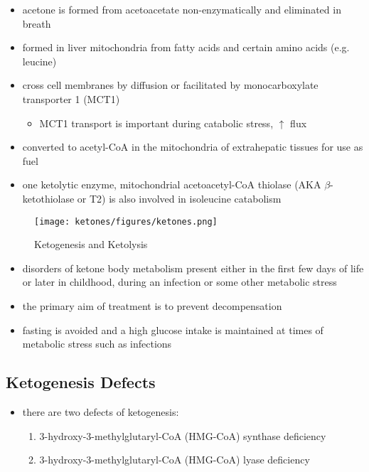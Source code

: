 \documentclass[12pt]{scrartcl}
\begin{document}
\begin{itemize}
\item acetone is formed from acetoacetate non-enzymatically and eliminated in breath
\item formed in liver mitochondria from fatty acids and certain amino acids (e.g. leucine)
\item cross cell membranes by diffusion or facilitated by monocarboxylate transporter 1 (MCT1)
\begin{itemize}
\item MCT1 transport is important during catabolic stress, \(\uparrow\) flux
\end{itemize}
\item converted to acetyl-CoA in the mitochondria of extrahepatic tissues for use as fuel
\item one ketolytic enzyme, mitochondrial acetoacetyl-CoA thiolase (AKA
\(\beta\)-ketothiolase or T2) is also involved in isoleucine catabolism
\end{itemize}

\begin{figure}[htbp]
\centering
\texttt{[image: ketones/figures/ketones.png]}
\caption{\label{fig:org17da55c}Ketogenesis and Ketolysis}
\end{figure}

\begin{itemize}
\item disorders of ketone body metabolism present either in the first few
days of life or later in childhood, during an infection or some
other metabolic stress
\item the primary aim of treatment is to prevent decompensation
\item fasting is avoided and a high glucose intake is maintained at times
of metabolic stress such as infections
\end{itemize}

\subsection{Ketogenesis Defects}
\label{sec:org5fd9180}
\begin{itemize}
\item there are two defects of ketogenesis:
\begin{enumerate}
\item 3-hydroxy-3-methylglutaryl-CoA (HMG-CoA) synthase deficiency
\item 3-hydroxy-3-methylglutaryl-CoA (HMG-CoA) lyase deficiency
\end{enumerate}
\end{itemize}
\end{document}
